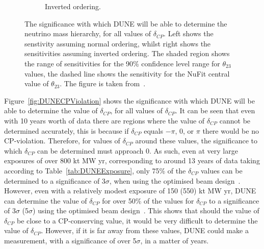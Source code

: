 \begin{figure}
\begin{subfigure}{0.49\textwidth}
    \caption{Inverted ordering.}
  \end{subfigure}
  \caption[The significance with which DUNE will be able to determine the neutrino mass hierarchy, for all values of $\delta_{CP}$]
          {The significance with which DUNE will be able to determine the neutrino mass hierarchy, for all values of $\delta_{CP}$. Left shows the senstivity assuming normal ordering, whilst right shows the sensitivities assuming inverted ordering. The shaded region shows the range of sensitivities for the 90\% confidence level range for $\theta_{23}$ values, the dashed line shows the sensitivity for the NuFit central value of $\theta_{23}$. The figure is taken from~\citep{DUNE2335}.}
  \label{fig:DUNEMassHierarchy}
\end{figure}

Figure~\ref{fig:DUNECPViolation} shows the significance with which DUNE will be able to determine the value of $\delta_{CP}$, for all values of $\delta_{CP}$. It can be seen that even with 10 years worth of data there are regions where the value of $\delta_{CP}$ cannot be determined accurately, this is because if $\delta_{CP}$ equals $-\pi$, 0, or $\pi$ there would be no CP-violation. Therefore, for values of $\delta_{CP}$ around these values, the significance to which $\delta_{CP}$ can be determined must approach 0. As such, even at very large exposures of over 800 kt MW yr, corresponding to around 13 years of data taking according to Table~\ref{tab:DUNEExposure}, only 75\% of the $\delta_{CP}$ values can be determined to a significance of 3$\sigma$, when using the optimised beam design~\citep{DUNE2401}. However, even with a relatively modest exposure of 150 (550) kt MW yr, DUNE can determine the value of $\delta_{CP}$ for over 50\% of the values for $\delta_{CP}$ to a significance of 3$\sigma$ (5$\sigma$) using the optimised beam design~\citep{DUNE2401}. This shows that should the value of $\delta_{CP}$ be close to a CP-conserving value, it would be very difficult to determine the value of $\delta_{CP}$. However, if it is far away from these values, DUNE could make a measurement, with a significance of over 5$\sigma$, in a matter of years. \\

